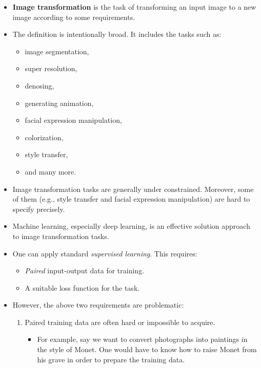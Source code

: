 \documentclass[10pt]{article}
\begin{document}
  \begin{itemize}
  	\item \textbf{Image transformation} is the task of transforming an input image to a new image according to some requirements.

  	\item The definition is intentionally broad. It includes the tasks such as:
  	\begin{itemize}
  		\item image segmentation,
  		\item super resolution,
  		\item denosing,
  		\item generating animation,
  		\item facial expression manipulation,
  		\item colorization,
  		\item style transfer,
  		\item and many more.
  	\end{itemize}

  	\item Image transformation tasks are generally under constrained. Moreover, some of them (e.g., style transfer and facial expression manipulation) are hard to specify precisely. 

  	\item Machine learning, especially deep learning, is an effective solution approach to image transformation tasks.

  	\item One can apply standard \emph{supervised learning}. This requires:
  	\begin{itemize}
  		\item \emph{Paired} input-output data for training.
  		\item A suitable loss function for the task.
  	\end{itemize}

  	\item However, the above two requirements are problematic:
  	\begin{enumerate}
  		\item Paired training data are often hard or impossible to acquire.
  		\begin{itemize}
  			\item For example, say we want to convert photographs into paintings in the style of Monet. One would have to know how to raise Monet from his grave in order to prepare the training data. 
  		\end{itemize}


\end{enumerate}
\end{itemize}
\end{document}
